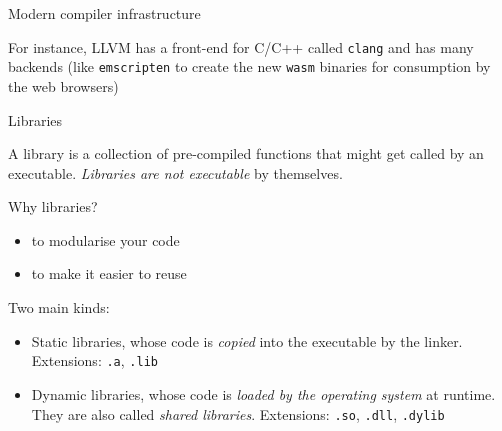 \documentclass[compress]{beamer}
\begin{document}
\begin{frame}{Modern compiler infrastructure}
    \begin{center}
    \end{center}

    For instance, LLVM has a front-end for C/C++ called \texttt{clang} and has
    many backends (like \texttt{emscripten} to create the new \texttt{wasm}
    binaries for consumption by the web browsers)
\end{frame}

\begin{frame}{Libraries}

    A library is a collection of pre-compiled functions that might get called by
    an executable. \emph{Libraries are not executable} by themselves.

    \begin{exampleblock}{Why libraries?}
        \begin{itemize}
            \item to modularise your code
            \item to make it easier to reuse
        \end{itemize}
    \end{exampleblock}

    \pause

    Two main kinds:

    \begin{itemize}
        \item Static libraries, whose code is \emph{copied} into the executable
            by the linker. Extensions: \texttt{.a}, \texttt{.lib}
        \item Dynamic libraries, whose code is \emph{loaded by the operating
            system} at runtime. They are also called \emph{shared libraries}.
            Extensions: \texttt{.so}, \texttt{.dll}, \texttt{.dylib}
    \end{itemize}

\end{frame}
\end{document}

